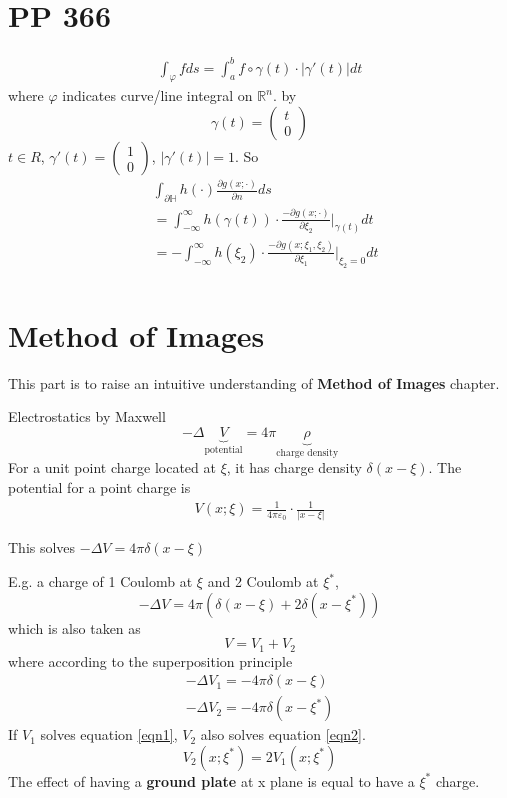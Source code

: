 \documentclass{article}
\numberwithin{equation}{section}
\newcommand{\<}{\langle}
\begin{document}
\section{PP 366}
\begin{align*}
	\int_{\varphi} f ds = \int_a^b f \circ \gamma(t)\cdot  |\gamma'(t)|dt
\end{align*}
where $\varphi$ indicates curve/line integral on $\mathbb{R}^n$. by
\[
	\gamma (t) = \begin{pmatrix}
		t \\ 0
	\end{pmatrix}
\]
$t \in R$, $\gamma'(t) = \begin{pmatrix} 1\\0 \end{pmatrix}$, $|\gamma'(t) | = 1$.
So
\begin{align*}
	&\int_{\partial \mathbb{H}} h(\cdot ) \frac{\partial g(x;\cdot )}{\partial n} ds \\
	&= \int_{-\infty}^\infty h(\gamma(t))\cdot \frac{-\partial g(x;\cdot )}{\partial \xi_2}|_{\gamma(t)} dt \\
	&= - \int _{- \infty }^{\infty}h(\xi_2)\cdot \frac{-\partial g(x;\xi_1,\xi_2 )}{\partial \xi_1}|_{\xi_2 = 0} dt \\
\end{align*}

\section{Method of Images}
\begin{tcolorbox}[colback=green!10!white]
This part is to raise an intuitive understanding of \textbf{Method of Images} chapter.
\end{tcolorbox}
Electrostatics by Maxwell
\[
	- \Delta \underbrace{V}_{\text{potential}} = 4 \pi \underbrace{\rho}_{\text{charge density}}
\]
For a unit point charge located at $\xi$, it has charge density $\delta(x- \xi)$. The potential for a point charge is
\begin{align*}
	V(x;\xi) = \frac{1}{4 \pi \varepsilon_0}\cdot  \frac{1}{|x-\xi|}
\end{align*}

This solves $-\Delta V = 4 \pi \delta(x-\xi)$

\begin{tcolorbox}[colback = blue!10!white]
E.g. a charge of 1 Coulomb at $\xi$ and 2 Coulomb at $\xi^*$,
\[
	- \Delta V = 4 \pi (\delta(x- \xi)+ 2 \delta(x- \xi^*))
\]
which is also taken as 
\[
	V = V_1 + V_2
\]
where according to the superposition principle
\begin{align}
	- \Delta V_1 = - 4 \pi \delta(x- \xi) \label{eqn1} \\
	- \Delta V_2 = - 4 \pi \delta(x- \xi^*) \label{eqn2} 
\end{align}
If $V_1$ solves equation \eqref{eqn1}, $V_2$ also solves equation \eqref{eqn2}. 
\[
	V_2(x; \xi^*) = 2 V_1(x;\xi^*)
\]
The effect of having a \textbf{ground plate} at x plane is equal to have a $\xi^*$ charge.
\end{tcolorbox}
\end{document}

